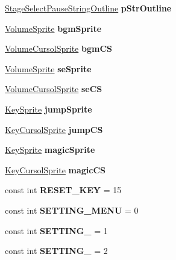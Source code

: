 \begin{DoxyCompactItemize}
\hyperlink{class_stage_select_pause_string_outline}{Stage\+Select\+Pause\+String\+Outline} {\bfseries p\+Str\+Outline}
\item 
\mbox{\label{class_pause_ab5d74d0999f19b88832026ac83eb0fb6}} 
\hyperlink{class_volume_sprite}{Volume\+Sprite} {\bfseries bgm\+Sprite}
\item 
\mbox{\label{class_pause_a29a4755fa15489b22e5493df751a8e26}} 
\hyperlink{class_volume_cursol_sprite}{Volume\+Cursol\+Sprite} {\bfseries bgm\+CS}
\item 
\mbox{\label{class_pause_aa9f4cda3f46b2fba7d9aa0ed132d6496}} 
\hyperlink{class_volume_sprite}{Volume\+Sprite} {\bfseries se\+Sprite}
\item 
\mbox{\label{class_pause_ab54f17922858174ce63e3e67f4913293}} 
\hyperlink{class_volume_cursol_sprite}{Volume\+Cursol\+Sprite} {\bfseries se\+CS}
\item 
\mbox{\label{class_pause_abf45f11ee2e1d903c653c8becbc2fc12}} 
\hyperlink{class_key_sprite}{Key\+Sprite} {\bfseries jump\+Sprite}
\item 
\mbox{\label{class_pause_a457a38a3bf1ef2259c9138d5475fe174}} 
\hyperlink{class_key_cursol_sprite}{Key\+Cursol\+Sprite} {\bfseries jump\+CS}
\item 
\mbox{\label{class_pause_a2ac956a38fd3b919b6e8a410cd697801}} 
\hyperlink{class_key_sprite}{Key\+Sprite} {\bfseries magic\+Sprite}
\item 
\mbox{\label{class_pause_a65b119c90df29a27f94e2894a2b81c44}} 
\hyperlink{class_key_cursol_sprite}{Key\+Cursol\+Sprite} {\bfseries magic\+CS}
\item 
\mbox{\label{class_pause_a6e17438ca83a2ff43fec45031946b749}} 
const int {\bfseries R\+E\+S\+E\+T\+\_\+\+K\+EY} = 15
\item 
\mbox{\label{class_pause_a3c6d7dc43ae2069c257e57ca00ace718}} 
const int {\bfseries S\+E\+T\+T\+I\+N\+G\+\_\+\+M\+E\+NU} = 0
\item 
\mbox{\label{class_pause_a4234ff83ead3aa5ae4c0d5ea186b0d5a}} 
const int {\bfseries S\+E\+T\+T\+I\+N\+G\+\_} = 1
\item 
\mbox{\label{class_pause_af22403f05b2a1343ccbff8cd3373604f}} 
const int {\bfseries S\+E\+T\+T\+I\+N\+G\+\_} = 2
\end{DoxyCompactItemize}


